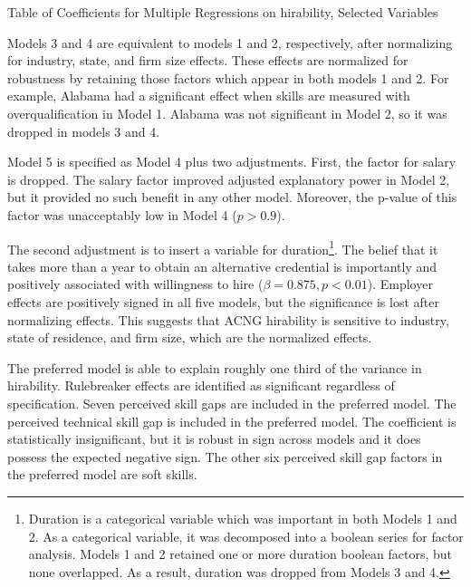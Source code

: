 \documentclass[review]{elsarticle}
\begin{document}
\begin{table}
    \caption{Table of Coefficients for Multiple Regressions on hirability, Selected Variables}
    \resizebox{\columnwidth}{!}{
        
    }
    \label{tab:table_new_ols}
\end{table}

Models 3 and 4 are equivalent to models 1 and 2, respectively, after normalizing for industry, state, and firm size effects.
These effects are normalized for robustness by retaining those factors which appear in both models 1 and 2.
For example, Alabama had a significant effect when skills are measured with overqualification in Model 1.
Alabama was not significant in Model 2, so it was dropped in models 3 and 4.

Model 5 is specified as Model 4 plus two adjustments.
First, the factor for salary is dropped.
The salary factor improved adjusted explanatory power in Model 2, but it provided no such benefit in any other model.
Moreover, the p-value of this factor was unacceptably low in Model 4 ($p > 0.9$).

The second adjustment is to insert a variable for duration\footnote{
    Duration is a categorical variable which was important in both Models 1 and 2.
    As a categorical variable, it was decomposed into a boolean series for factor analysis.
    Models 1 and 2 retained one or more duration boolean factors, but none overlapped.
    As a result, duration was dropped from Models 3 and 4.
}.
The belief that it takes more than a year to obtain an alternative credential
is importantly and positively associated with willingness to hire ($\beta = 0.875, p < 0.01$).
Employer effects are positively signed in all five models, but the significance is lost after normalizing effects.
This suggests that ACNG hirability is sensitive to industry, state of residence, and firm size, which are the normalized effects.

The preferred model is able to explain roughly one third of the variance in hirability.
Rulebreaker effects are identified as significant regardless of specification.
Seven perceived skill gaps are included in the preferred model.
The perceived technical skill gap is included in the preferred model.
The coefficient is statistically insignificant, but it is robust in sign across models and it does possess the expected negative sign.
The other six perceived skill gap factors in the preferred model are soft skills.
\end{document}
